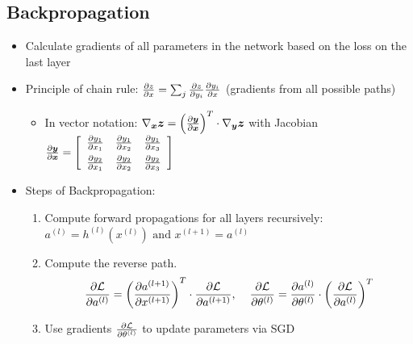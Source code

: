\subsection{Backpropagation}
\begin{itemize}
	\item Calculate gradients of all parameters in the network based on the loss on the last layer
	\item Principle of chain rule: $\frac{\partial z}{\partial x} = \sum_j \frac{\partial z}{\partial y_i}\frac{\partial y_i}{\partial x}$ (gradients from all possible paths)
	\begin{itemize}
		\item In vector notation: $\nabla_{\bm{x}} \bm{z} = \left(\frac{\partial \bm{y}}{\partial \bm{x}}\right)^T \cdot \nabla_{\bm{y}} \bm{z}$ with Jacobian $\frac{\partial \bm{y}}{\partial \bm{x}} = \left[\begin{array}{ccc}
		\frac{\partial y_1}{\partial x_1} & \frac{\partial y_1}{\partial x_2} & \frac{\partial y_1}{\partial x_3} \\[5pt]
		\frac{\partial y_2}{\partial x_1} & \frac{\partial y_2}{\partial x_2} & \frac{\partial y_2}{\partial x_3} \\
		\end{array}\right]$
	\end{itemize}
	\item Steps of Backpropagation:
	\begin{enumerate}
		\item Compute forward propagations for all layers recursively:
		$a^{(l)} = h^{(l)}\left(x^{(l)}\right) \text{ and } x^{(l+1)} = a^{(l)}$
		\item Compute the reverse path. 
		$$\frac{\partial \mathcal{L}}{\partial a^{(l)}} = \left(\frac{\partial a^{(l+1)}}{\partial x^{(l+1)}}\right)^T \cdot \frac{\partial \mathcal{L}}{\partial a^{(l+1)}}, \hspace{4mm} \frac{\partial \mathcal{L}}{\partial \theta^{(l)}} = \frac{\partial a^{(l)}}{\partial \theta^{(l)}} \cdot \left(\frac{\partial \mathcal{L}}{\partial a^{(l)}}\right)^T$$
		\item Use gradients $\frac{\partial \mathcal{L}}{\partial \theta^{(l)}}$ to update parameters via SGD
	\end{enumerate}
\end{itemize}